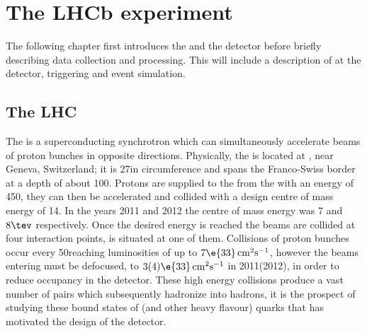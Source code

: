 \chapter{The LHCb experiment}
\label{ch:lhcb}

The following chapter first introduces the \lhc and the \lhcb detector before briefly
describing data collection and processing.
This will include a description of \pid at the \lhcb detector, triggering and event simulation.



\section{The LHC}
The \lhc is a superconducting synchrotron which can simultaneously accelerate beams of proton bunches
in opposite directions.
Physically, the \lhc is located at \cern, near Geneva, Switzerland; it is 27\km in
circumference and spans the Franco-Swiss border at a depth of about 100\m.
Protons are supplied to the \lhc from the \sps with an energy of 450\gev, they can then
be accelerated and collided with a design centre of mass energy of 14\tev.
In the years 2011 and 2012 the centre of mass energy was 7 and $8\tev$ respectively.
Once the desired energy is reached the beams are collided at four interaction points, \lhcb is
situated at one of them.
Collisions of proton bunches occur every 50\ns reaching luminosities of up to
$7\e{33}\,\mathrm{cm}^{2}\mathrm{s}^{-1}$, however the beams entering \lhcb must be defocused, to
$3(4)\e{33}\,\mathrm{cm}^{2}\mathrm{s}^{-1}$ in 2011(2012), in order to reduce occupancy in the
\lhcb detector.
These high energy collisions produce a vast number of \bbbar pairs which subsequently hadronize
into \bquark hadrons, it is the prospect of studying these bound states of \bquark (and other heavy
flavour) quarks that has motivated the design of the \lhcb detector.







